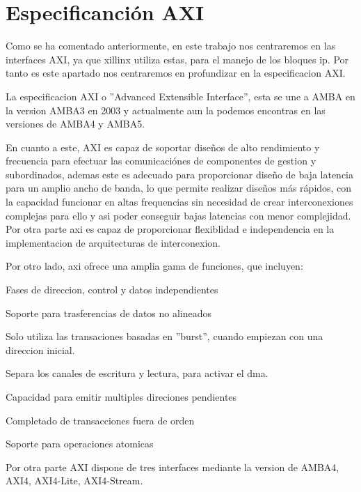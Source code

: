 \documentclass[11pt,spanish,listoffigures,listoftables]{tfgetsinf}
\newenvironment{no_desc}{
   \begin{itemize}
      \setlength{\itemsep}{0.2pt}
}{\end{itemize}}
\begin{document}
   \section {Especificanción AXI}

      Como se ha comentado anteriormente, en este trabajo nos centraremos en
      las interfaces AXI, ya que xillinx utiliza estas, para el manejo de los
      bloques ip. Por tanto es este apartado nos centraremos en profundizar
      en la especificacion AXI.

      La especificacion AXI o ''Advanced Extensible Interface'', esta se une
      a AMBA en la version AMBA3 en 2003 y actualmente aun la podemos
      encontras en las versiones de AMBA4 y AMBA5.
      
      En cuanto a este, AXI es capaz de soportar diseños de alto rendimiento
      y frecuencia para efectuar las comunicaciónes de componentes de gestion
      y subordinados, ademas este es adecuado para proporcionar diseño de
      baja latencia para un amplio ancho de banda, lo que permite realizar
      diseños más rápidos, con la capacidad  funcionar en altas frequencias
      sin necesidad de crear interconexiones complejas para ello y asi poder
      conseguir bajas latencias con menor complejidad. Por otra parte axi es
      capaz de proporcionar flexiblidad e independencia en la implementacion
      de arquitecturas de interconexion.

      Por otro lado, axi ofrece una amplia gama de funciones, que incluyen:
      \begin{no_desc}
         \item Fases de direccion, control y datos independientes 
         \item Soporte para trasferencias de datos no alineados
         \item Solo utiliza las transaciones basadas en ''burst'', cuando 
         empiezan con una direccion inicial.
         \item Separa los canales de escritura y lectura, para activar el dma.
         \item Capacidad para emitir multiples direciones pendientes
         \item Completado de transacciones fuera de orden
         \item Soporte para operaciones atomicas
      \end{no_desc}

      Por otra parte AXI dispone de tres interfaces mediante la version de AMBA4, 
      AXI4, AXI4-Lite, AXI4-Stream.
   
\end{document}
